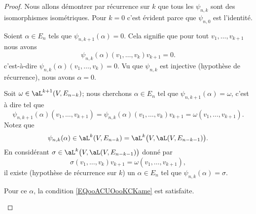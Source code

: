 \begin{proof}
	Nous allons démontrer par récurrence sur \( k\) que tous les \( \psi_{n,k}\) sont des isomorphismes isométriques. Pour \( k=0\) c'est évident parce que \( \psi_{n,0}\) est l'identité.

	\begin{subproof}
		\spitem[Injective]
		Soient \( \alpha\in E_n\) tels que \( \psi_{n,k+1}(\alpha)=0\). Cela signifie que pour tout \( v_1,\ldots, v_{k+1}\) nous avons
		\begin{equation}
			\psi_{n,k}(\alpha)(v_1,\ldots, v_k)v_{k+1}=0.
		\end{equation}
		c'est-à-dire \( \psi_{n,k}(\alpha)(v_1,\ldots, v_{k})=0\). Vu que \( \psi_{n,k}\) est injective (hypothèse de récurrence), nous avons \( \alpha=0\).

		\spitem[Surjective]
		Soit \( \omega\in \aL^{k+1}(V,E_{n-k})\); nous cherchons \( \alpha\in E_n\) tel que \( \psi_{n,k+1}(\alpha)=\omega\), c'est à dire tel que
		\begin{equation}        \label{EQooACUOooKCKame}
			\psi_{n,k+1}(\alpha)(v_1,\ldots, v_{k+1})=\psi_{n,k}(\alpha)(v_1,\ldots, v_k)v_{k+1}=\omega(v_1,\ldots, v_{k+1}).
		\end{equation}
		Notez que
		\begin{equation}
			\psi_{n,k}(\alpha)\in \aL^k(V,E_{n-k})=\aL^k\big( V,\aL(V,E_{n-k-1}) \big).
		\end{equation}
		En considérant \( \sigma\in \aL^k\big( V,\aL(V,E_{n-k-1}) \big)\) donné par
		\begin{equation}
			\sigma(v_1,\ldots, v_k)v_{k+1}=\omega(v_1,\ldots, v_{k+1}),
		\end{equation}
		il existe (hypothèse de récurrence sur \( k\)) un \( \alpha\in E_n\) tel que \( \psi_{n,k}(\alpha)=\sigma\).

		Pour ce \( \alpha\), la condition \eqref{EQooACUOooKCKame} est satisfaite.


\end{subproof}
\end{proof}
